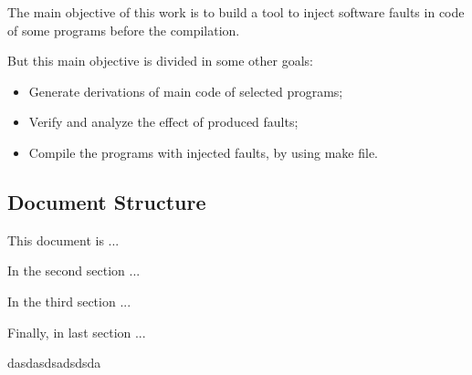 The main objective of this work is to build a tool to inject software faults in code of some programs before the compilation.

But this main objective is divided in some other goals:

\begin{itemize}
	\item Generate derivations of main code of selected programs;
	\item Verify and analyze the effect of produced faults;
	\item Compile the programs with injected faults, by using make file.
\end{itemize}


\subsection{Document Structure}

This document is ...

In the second section ...

In the third section ...

Finally, in last section ...

dasdasdsadsdsda